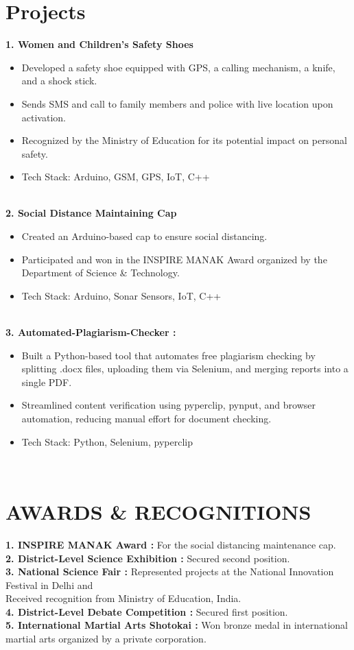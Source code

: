 \documentclass[10pt]{article} %
\begin{document}
\section{Projects}
{
{\bf1.  Women and Children's Safety Shoes} \begin{itemize}
    \item  Developed a safety shoe equipped with GPS, a calling mechanism, a knife, and a shock stick.
    \item Sends SMS and call to family members and police with live
location upon activation.
    \item Recognized by the Ministry of Education for its potential impact
on personal safety.
    \item Tech Stack: Arduino, GSM, GPS, IoT, C++
\end{itemize} \\

{\bf2. Social Distance Maintaining Cap} \begin{itemize}
    \item  Created an Arduino-based cap to ensure social distancing.
    \item Participated and won in the INSPIRE MANAK Award organized
by the Department of Science \& Technology.
    \item Tech Stack: Arduino, Sonar Sensors, IoT, C++
\end{itemize} \\

{\bf3. Automated-Plagiarism-Checker :} \begin{itemize}
    \item  Built a Python-based tool that automates free plagiarism checking by splitting .docx files, uploading them via Selenium, and merging reports into a single PDF.
    \item Streamlined content verification using pyperclip, pynput, and browser automation, reducing manual effort for document checking.
    \item Tech Stack: Python, Selenium, pyperclip
\end{itemize} \\

\hline

\section{AWARDS \& RECOGNITIONS}
{
{\bf1.  INSPIRE MANAK Award :} \> For the social distancing maintenance cap. \\
{\bf2. District-Level Science Exhibition : } \> Secured second position. \\
{\bf3. National Science Fair : } \> Represented projects at the National Innovation Festival in Delhi and \\ Received recognition from Ministry of Education, India. \\
{\bf4. District-Level Debate Competition :} \>Secured first position. \\
{\bf5. International Martial Arts Shotokai :} \>Won bronze medal in
international martial arts organized by a private corporation.\\
}




}
\end{document}
